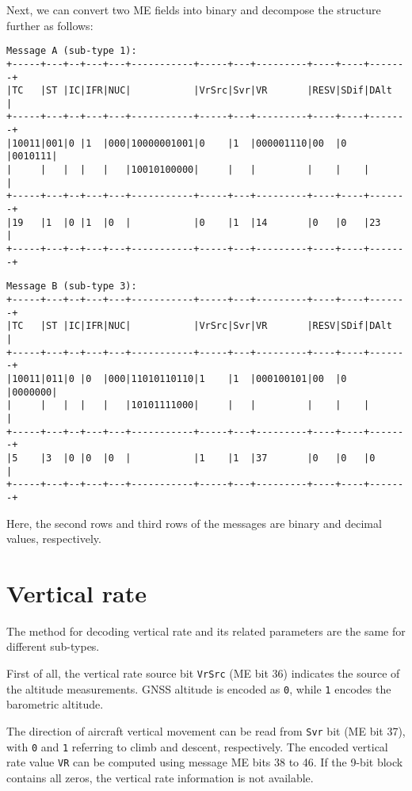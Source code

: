 Next, we can convert two ME fields into binary and decompose the structure further as follows:

\begin{verbatim}
Message A (sub-type 1):
+-----+---+--+---+---+-----------+-----+---+---------+----+----+-------+
|TC   |ST |IC|IFR|NUC|           |VrSrc|Svr|VR       |RESV|SDif|DAlt   |
+-----+---+--+---+---+-----------+-----+---+---------+----+----+-------+
|10011|001|0 |1  |000|10000001001|0    |1  |000001110|00  |0   |0010111|
|     |   |  |   |   |10010100000|     |   |         |    |    |       |
+-----+---+--+---+---+-----------+-----+---+---------+----+----+-------+
|19   |1  |0 |1  |0  |           |0    |1  |14       |0   |0   |23     |
+-----+---+--+---+---+-----------+-----+---+---------+----+----+-------+
\end{verbatim}

\begin{verbatim}
Message B (sub-type 3):
+-----+---+--+---+---+-----------+-----+---+---------+----+----+-------+
|TC   |ST |IC|IFR|NUC|           |VrSrc|Svr|VR       |RESV|SDif|DAlt   |
+-----+---+--+---+---+-----------+-----+---+---------+----+----+-------+
|10011|011|0 |0  |000|11010110110|1    |1  |000100101|00  |0   |0000000|
|     |   |  |   |   |10101111000|     |   |         |    |    |       | 
+-----+---+--+---+---+-----------+-----+---+---------+----+----+-------+
|5    |3  |0 |0  |0  |           |1    |1  |37       |0   |0   |0      |
+-----+---+--+---+---+-----------+-----+---+---------+----+----+-------+
\end{verbatim}

Here, the second rows and third rows of the messages are binary and decimal values, respectively.


\section{Vertical rate}

The method for decoding vertical rate and its related parameters are the same for different sub-types.

First of all, the vertical rate source bit \texttt{VrSrc} (ME bit 36) indicates the source of the altitude measurements. GNSS altitude is encoded as \texttt{0}, while \texttt{1} encodes the barometric altitude.

The direction of aircraft vertical movement can be read from \texttt{Svr} bit (ME bit 37), with \texttt{0} and \texttt{1} referring to climb and descent, respectively. The encoded vertical rate value \texttt{VR} can be computed using message ME bits 38 to 46. If the 9-bit block contains all zeros, the vertical rate information is not available.

